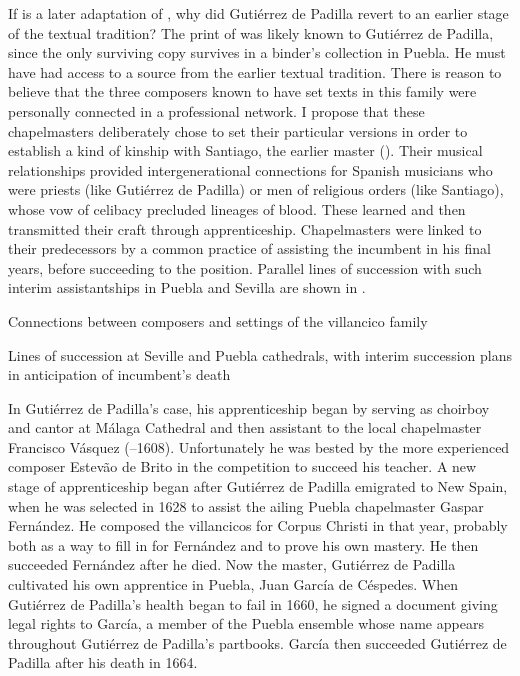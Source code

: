 If  is a later adaptation of , why did Gutiérrez
de Padilla revert to an earlier stage of the textual tradition?
The print of  was likely known to Gutiérrez de Padilla, since
the only surviving copy survives in a binder's collection in Puebla. 
He must have had access to a source from the earlier textual tradition.
There is reason to believe that the three composers known to have set texts in
this family were personally connected in a professional network.
I propose that these chapelmasters deliberately chose to set their particular
versions in order to establish a kind of kinship with Santiago, the earlier
master ().
Their musical relationships provided intergenerational connections for Spanish
musicians who were priests (like Gutiérrez de Padilla) or men of religious orders
(like Santiago), whose vow of celibacy precluded lineages of blood. 
These  learned and then transmitted their craft through
apprenticeship.
Chapelmasters were linked to their predecessors by a common practice of
assisting the incumbent in his final years, before succeeding to the position.
Parallel lines of succession with such interim assistantships in Puebla and
Sevilla are shown in .


{Connections between composers and settings of the  villancico
family}

{Lines of succession at Seville and Puebla cathedrals, with interim succession
plans in anticipation of incumbent's death}

In Gutiérrez de Padilla's case, his apprenticeship began by serving as choirboy
and cantor at Málaga Cathedral and then assistant to the local chapelmaster
Francisco Vásquez (--1608).
Unfortunately he was bested by the more experienced composer Estevão de Brito
in the competition to succeed his teacher.%
    \Autocites
    {Gembero:Padilla}
    {Stevenson:BritoE}
A new stage of apprenticeship began after Gutiérrez de Padilla emigrated to New
Spain, when he was selected in 1628 to assist the ailing Puebla chapelmaster
Gaspar Fernández.%
    \Autocite{Morales:Fernandez}
He composed the villancicos for Corpus Christi in that year, probably both as a
way to fill in for Fernández and to prove his own mastery.%
    \Autocite{Cashner:Cards}
He then succeeded Fernández after he died.
Now the master, Gutiérrez de Padilla cultivated his own apprentice in Puebla,
Juan García de Céspedes.
When Gutiérrez de Padilla's health began to fail in 1660, he signed a
 document giving legal rights to García, a member of
the Puebla ensemble whose name appears throughout Gutiérrez de Padilla's
partbooks.  
García then succeeded Gutiérrez de Padilla after his death in 1664.%
    \Autocite[237--238]{Mauleon:PadillaCivil}

